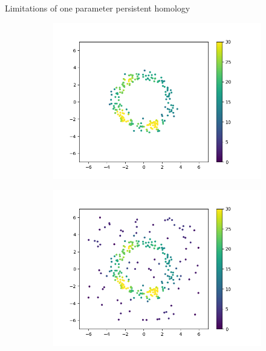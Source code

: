 \documentclass{beamer}
\begin{document}
    \begin{frame}{Limitations of one parameter persistent homology}
        \begin{figure}[h]
            \centering
            \begin{subfigure}{.45\textwidth}
              \centering
              \includegraphics[width=.9\linewidth]{./figures/circle}
              \label{fig:circle}
            \end{subfigure}
            \begin{subfigure}{.45\textwidth}
              \centering
              \includegraphics[width=.9\linewidth]{./figures/circle-all-points}
              \label{fig:circle-all-points}
            \end{subfigure}
            \begin{subfigure}{.45\textwidth}
              \centering

\end{subfigure}
\end{figure}
\end{frame}
\end{document}
